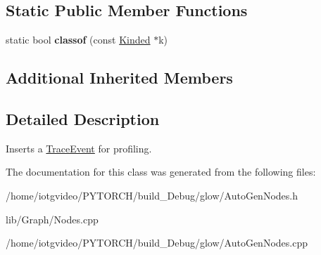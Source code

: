 \subsection*{Static Public Member Functions}
\begin{DoxyCompactItemize}
\item 
\mbox{\label{classglow_1_1_trace_event_node_afd7a0e1f67856ae6a1922dd08fe12be3}} 
static bool {\bfseries classof} (const \hyperlink{classglow_1_1_kinded}{Kinded} $\ast$k)
\end{DoxyCompactItemize}
\subsection*{Additional Inherited Members}


\subsection{Detailed Description}
Inserts a \hyperlink{structglow_1_1_trace_event}{Trace\+Event} for profiling. 

The documentation for this class was generated from the following files\+:\begin{DoxyCompactItemize}
\item 
/home/iotgvideo/\+P\+Y\+T\+O\+R\+C\+H/build\+\_\+\+Debug/glow/Auto\+Gen\+Nodes.\+h\item 
lib/\+Graph/Nodes.\+cpp\item 
/home/iotgvideo/\+P\+Y\+T\+O\+R\+C\+H/build\+\_\+\+Debug/glow/Auto\+Gen\+Nodes.\+cpp\end{DoxyCompactItemize}

